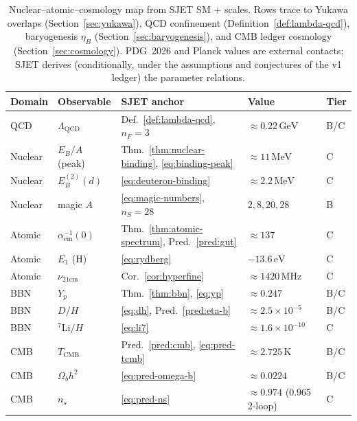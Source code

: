 \documentclass[aps,prd,onecolumn,amsmath,amssymb,nofootinbib,11pt]{revtex4-2}
\numberwithin{equation}{section}
\theoremstyle{plain}
\theoremstyle{definition}
\theoremstyle{remark}
\begin{document}
\begin{table}[ht]
\centering
\small
\renewcommand{\arraystretch}{1.14}
\begin{tabular}{@{}lllll@{}}
\toprule
\textbf{Domain} & \textbf{Observable} & \textbf{SJET anchor} &
\textbf{Value} & \textbf{Tier} \\
\midrule
QCD &
  $\Lambda_{\mathrm{QCD}}$ &
  Def.~\ref{def:lambda-qcd}, $n_F=3$ &
  $\approx 0.22\,\mathrm{GeV}$ &
  B/C \\
Nuclear &
  $E_B/A$ (peak) &
  Thm.~\ref{thm:nuclear-binding}, \eqref{eq:binding-peak} &
  $\approx 11\,\mathrm{MeV}$ &
  C \\
Nuclear &
  $E_B^{(2)}(d)$ &
  \eqref{eq:deuteron-binding} &
  $\approx 2.2\,\mathrm{MeV}$ &
  C \\
Nuclear &
  magic $A$ &
  \eqref{eq:magic-numbers}, $n_S=28$ &
  $2,8,20,28$ &
  B \\
Atomic &
  $\alpha_{\mathrm{em}}^{-1}(0)$ &
  Thm.~\ref{thm:atomic-spectrum}, Pred.~\ref{pred:gut} &
  $\approx 137$ &
  C \\
Atomic &
  $E_1$ (H) &
  \eqref{eq:rydberg} &
  $-13.6\,\mathrm{eV}$ &
  C \\
Atomic &
  $\nu_{21\mathrm{cm}}$ &
  Cor.~\ref{cor:hyperfine} &
  $\approx 1420\,\mathrm{MHz}$ &
  C \\
BBN &
  $Y_p$ &
  Thm.~\ref{thm:bbn}, \eqref{eq:yp} &
  $\approx 0.247$ &
  B/C \\
BBN &
  $D/H$ &
  \eqref{eq:dh}, Pred.~\ref{pred:eta-b} &
  $\approx 2.5\times 10^{-5}$ &
  B/C \\
BBN &
  ${}^7\mathrm{Li}/H$ &
  \eqref{eq:li7} &
  $\approx 1.6\times 10^{-10}$ &
  C \\
CMB &
  $T_{\mathrm{CMB}}$ &
  Pred.~\ref{pred:cmb}, \eqref{eq:pred-tcmb} &
  $\approx 2.725\,\mathrm{K}$ &
  B/C \\
CMB &
  $\Omega_b h^2$ &
  \eqref{eq:pred-omega-b} &
  $\approx 0.0224$ &
  B/C \\
CMB &
  $n_s$ &
  \eqref{eq:pred-ns} &
  $\approx 0.974$ (0.965 2-loop) &
  C \\
\bottomrule
\end{tabular}
\caption{Nuclear--atomic--cosmology map from SJET SM $+$ scales. Rows trace
to Yukawa overlaps (Section~\ref{sec:yukawa}), QCD confinement
(Definition~\ref{def:lambda-qcd}), baryogenesis $\eta_B$
(Section~\ref{sec:baryogenesis}), and CMB ledger cosmology
(Section~\ref{sec:cosmology}). PDG~2026 and Planck values are external
contacts; SJET derives (conditionally, under the assumptions and conjectures of the v1 ledger) the parameter relations.}
\label{tab:nuclear-cosmo-map}
\end{table}
\end{document}

